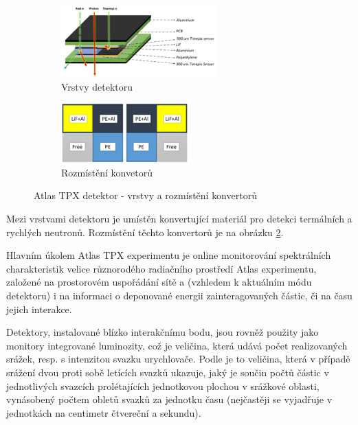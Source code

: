 \begin{figure}[th]
	\begin{center}
		\begin{subfigure}{6cm}
			\includegraphics[width=6cm]{figures/tpx_lay.png}	
			\caption{Vrstvy detektoru}
			\label{fig:tpx_detector_layers}
		\end{subfigure}
		\hspace{0.5cm}
		\begin{subfigure}{5cm}
			\includegraphics[width=5cm]{figures/tpx_conv.png}
			\caption{Rozmístění konvetorů}
			\label{fig:tpx_detector_convertors}
		\end{subfigure}
		\caption{Atlas TPX detektor - vrstvy a rozmístění konvertorů}
		\label{fig:tpx_detector}
	\end{center}			
\end{figure}

Mezi vrstvami detektoru je umístěn konvertující materiál pro detekci termálních a rychlých neutronů. Rozmístění těchto konvertorů je na obrázku \ref{fig:tpx_detector_convertors}.

Hlavním úkolem Atlas TPX experimentu je online monitorování spektrálních charakteristik velice různorodého radiačního prostředí Atlas experimentu, založené na prostorovém uspořádání sítě a (vzhledem k aktuálním módu detektoru) i na informaci o deponované energii zainteragovaných částic, či na času jejich interakce. 


Detektory, instalované blízko interakčnímu bodu, jsou rovněž použity jako monitory integrované luminozity, což je veličina, která udává počet realizovaných srážek, resp. s intenzitou svazku urychlovače. Podle \cite{wagner:o_lhc} je to veličina, která v případě srážení dvou proti sobě letících svazků ukazuje, jaký je součin počtů částic v jednotlivých svazcích prolétajících jednotkovou plochou v srážkové oblasti, vynásobený počtem obletů svazků za jednotku času (nejčastěji se vyjadřuje v jednotkách na centimetr čtvereční a sekundu).

